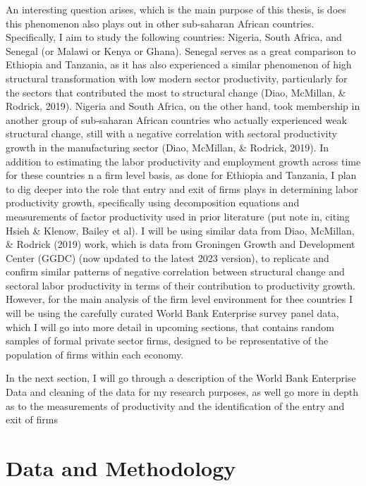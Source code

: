 \documentclass[
  12pt,
  letterpaper,
  DIV=11,
  numbers=noendperiod]{scrartcl}
\begin{document}
An interesting question arises, which is the main purpose of this
thesis, is does this phenomenon also plays out in other sub-saharan
African countries. Specifically, I aim to study the following countries:
Nigeria, South Africa, and Senegal (or Malawi or Kenya or Ghana).
Senegal serves as a great comparison to Ethiopia and Tanzania, as it has
also experienced a similar phenomenon of high structural transformation
with low modern sector productivity, particularly for the sectors that
contributed the most to structural change (Diao, McMillan, \& Rodrick,
2019). Nigeria and South Africa, on the other hand, took membership in
another group of sub-saharan African countries who actually experienced
weak structural change, still with a negative correlation with sectoral
productivity growth in the manufacturing sector (Diao, McMillan, \&
Rodrick, 2019). In addition to estimating the labor productivity and
employment growth across time for these countries n a firm level basis,
as done for Ethiopia and Tanzania, I plan to dig deeper into the role
that entry and exit of firms plays in determining labor productivity
growth, specifically using decomposition equations and measurements of
factor productivity used in prior literature (put note in, citing Hsieh
\& Klenow, Bailey et al). I will be using similar data from Diao,
McMillan, \& Rodrick (2019) work, which is data from Groningen Growth
and Development Center (GGDC) (now updated to the latest 2023 version),
to replicate and confirm similar patterns of negative correlation
between structural change and sectoral labor productivity in terms of
their contribution to productivity growth. However, for the main
analysis of the firm level environment for thee countries I will be
using the carefully curated World Bank Enterprise survey panel data,
which I will go into more detail in upcoming sections, that contains
random samples of formal private sector firms, designed to be
representative of the population of firms within each economy.

In the next section, I will go through a description of the World Bank
Enterprise Data and cleaning of the data for my research purposes, as
well go more in depth as to the measurements of productivity and the
identification of the entry and exit of firms

\hypertarget{data-and-methodology}{%
\section{Data and Methodology}\label{data-and-methodology}}
\end{document}
